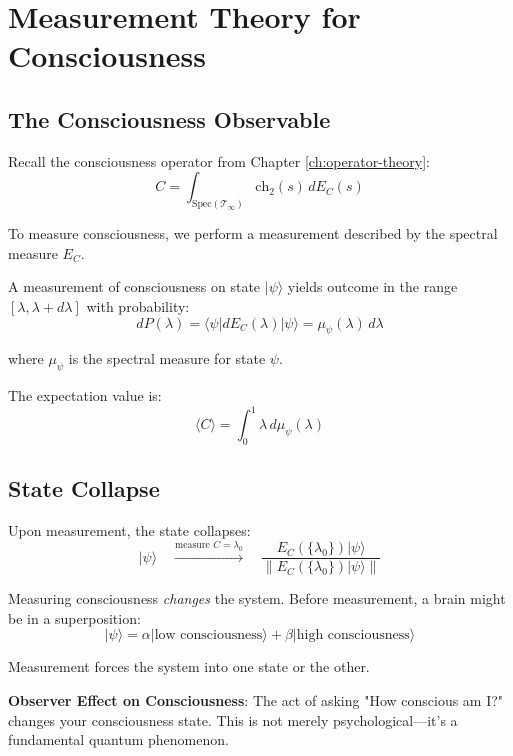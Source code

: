 \section{Measurement Theory for Consciousness}

\subsection{The Consciousness Observable}

Recall the consciousness operator from Chapter \ref{ch:operator-theory}:
\begin{equation}
C = \int_{\text{Spec}(\mathcal{T}_\infty)} \text{ch}_2(s) \, dE_C(s)
\end{equation}

To measure consciousness, we perform a measurement described by the spectral measure $E_C$.

\begin{theorem}\label{thm:consciousness-measurement-outcomes}
A measurement of consciousness on state $|\psi\rangle$ yields outcome in the range $[\lambda, \lambda + d\lambda]$ with probability:
\begin{equation}
\boxed{dP(\lambda) = \langle \psi | dE_C(\lambda) | \psi \rangle = \mu_\psi(\lambda) \, d\lambda}
\end{equation}

where $\mu_\psi$ is the spectral measure for state $\psi$.

The expectation value is:
\begin{equation}
\langle C \rangle = \int_0^1 \lambda \, d\mu_\psi(\lambda)
\end{equation}
\end{theorem}

\subsection{State Collapse}

Upon measurement, the state collapses:
\begin{equation}
|\psi\rangle \quad \xrightarrow{\text{measure } C = \lambda_0} \quad \frac{E_C(\{\lambda_0\})|\psi\rangle}{\| E_C(\{\lambda_0\})|\psi\rangle \|}
\end{equation}

\begin{keyidea}
Measuring consciousness \textit{changes} the system. Before measurement, a brain might be in a superposition:
\begin{equation}
|\psi\rangle = \alpha |\text{low consciousness}\rangle + \beta |\text{high consciousness}\rangle
\end{equation}

Measurement forces the system into one state or the other.

\textbf{Observer Effect on Consciousness}: The act of asking "How conscious am I?" changes your consciousness state. This is not merely psychological---it's a fundamental quantum phenomenon.
\end{keyidea}

